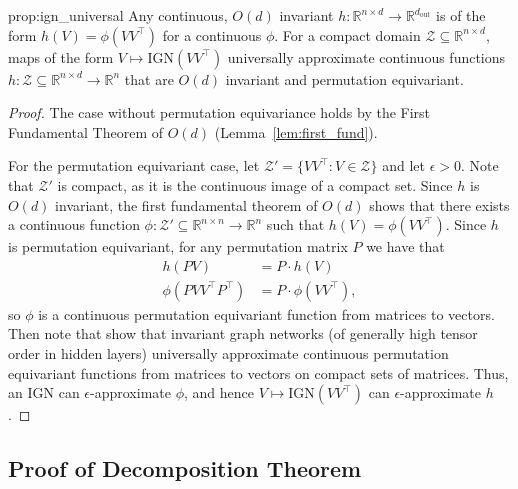 \documentclass{article} \usepackage{iclr2023_conference,times}
\newcommand{\RR}{\mathbb R}
\newcommand{\mc}[1]{\mathcal{#1}}
\newcommand{\mrm}[1]{\mathrm{#1}}
\newcommand{\dout}{d_{\mrm{out}}}
\begin{document}
\begin{repproposition}{prop:ign_universal}
    Any continuous, $O(d)$ invariant $h: \RR^{n \times d} \to \RR^{\dout}$ is of the form $h(V) = \phi(VV^\top)$ for a continuous $\phi$. For a compact domain $\mc Z \subseteq \RR^{n \times d}$, maps of the form $V \mapsto \mrm{IGN}(VV^\top)$ universally approximate continuous functions $h: \mc Z \subseteq \RR^{n \times d} \to \RR^n$ that are $O(d)$ invariant and permutation equivariant.
\end{repproposition}


\begin{proof}
    The case without permutation equivariance holds by the First Fundamental Theorem of $O(d)$ (Lemma~\ref{lem:first_fund}).
    
    For the permutation equivariant case, let $\mc Z' = \{ VV^\top : V \in \mc Z\}$ and let $\epsilon > 0$. Note that $\mc Z'$ is compact, as it is the continuous image of a compact set. Since $h$ is $O(d)$ invariant, the first fundamental theorem of $O(d)$ shows that there exists a continuous function $\phi: \mc Z' \subseteq \RR^{n \times n} \to \RR^n$ such that $h(V) = \phi(VV^\top)$. Since $h$ is permutation equivariant, for any permutation matrix $P$ we have that
    \begin{align}
        h(PV) & = P \cdot h(V)\\
        \phi(P V V^\top P^\top) & = P \cdot \phi(V V^\top),
    \end{align}
    so $\phi$ is a continuous permutation equivariant function from matrices to vectors. Then note that \cite{keriven2019universal} show that invariant graph networks (of generally high tensor order in hidden layers) universally approximate continuous permutation equivariant functions from matrices to vectors on compact sets of matrices.  Thus, an $\mrm{IGN}$ can $\epsilon$-approximate $\phi$, and hence $V \mapsto \mrm{IGN}(VV^\top)$ can $\epsilon$-approximate $h$.
\end{proof}

\subsection{Proof of Decomposition Theorem}\label{appendix:general_ansatz}
\end{document}
